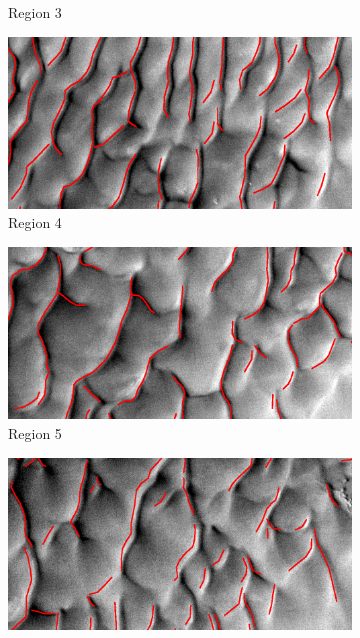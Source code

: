 \begin{figure}[htbp]
\begin{subfigure}[b]{0.3\textwidth}
		\caption{  Region 3 }
		\label{fig:area3_image}
	\end{subfigure}
	\begin{subfigure}[b]{0.3\textwidth}
		\centering
		\includegraphics[width=\textwidth]{figures/area4_with_gt}
		\caption{  Region 4 }
		\label{fig:area4_image}
	\end{subfigure}
	\begin{subfigure}[b]{0.3\textwidth}
		\centering
		\includegraphics[width=\textwidth]{figures/area5_with_gt}
		\caption{  Region 5 }
		\label{fig:area5_image}
	\end{subfigure}
	\begin{subfigure}[b]{0.3\textwidth}
		\centering
		\includegraphics[width=\textwidth]{figures/area6_with_gt}

\end{subfigure}
\end{figure}
